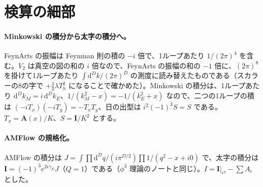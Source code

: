 \documentclass[a4paper,10pt]{ltjsarticle}
\newcommand{\dd}{\mathrm{d}}
\newcommand{\Aeps}{A_\epsilon}
\begin{document}
\section{検算の細部}\label{app:details}

\paragraph{Minkowski の積分から太字の積分へ。}FeynArts の振幅は Feynman 則の積の $-i$ 倍で、1ループあたり $1/(2\pi)^4$ を含む。$V_2$ は真空の図の和の $i$ 倍なので、FeynArts の振幅の和の $-1$ 倍に、$(2\pi)^8$ を掛けて1ループあたり $\int\dd^Dk/(2\pi)^D$ の測度に読み替えたものである（スカラーの8の字で $+\frac34\lambda T_h^2$ になることで確かめた）。Minkowski の積分は、1ループあたり $\dd^Dk_M=i\,\dd^Dk_E$、$1/(k_M^2-x)=-1/(k_E^2+x)$ なので、二つの1ループの積は $(-iT_x)(-iT_y)=-T_xT_y$、日の出型は $i^2(-1)^3S=S$ である。$T_x=\mathbf A(x)/K$、$S=\mathbf I/K^2$ とする。

\paragraph{AMFlow の規格化。}AMFlow の積分は $J=\int\prod\dd^Dq/(i\pi^{D/2})\prod1/(q^2-x+i0)$ で、太字の積分は $\mathbf I=(-1)^3e^{2\epsilon\gamma_E}J$（$Q=1$）である（$\phi^3$ 理論のノートと同じ）。$I=\mathbf I|_{\epsilon^0}-\sum\Aeps$ とした。
\end{document}
